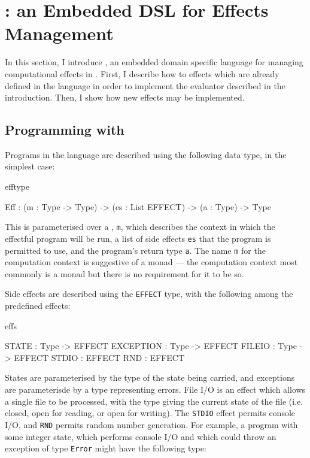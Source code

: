 \section{\Eff{}: an Embedded DSL for Effects Management} 

In this section, I introduce \Eff{}, an embedded domain specific language
for managing computational effects in \Idris{}. First, I describe how to
 effects which are already defined in the language in order to
implement the evaluator described in the introduction. Then, I show how new
effects may be implemented.

\label{sect:effdsl}

\subsection{Programming with \Eff{}}

Programs in the \Eff{} language are described using the following data type,
in the simplest case:

\begin{SaveVerbatim}{efftype}

Eff  : (m  : Type -> Type) -> 
       (es : List EFFECT) -> 
       (a  : Type) -> Type

\end{SaveVerbatim}

\noindent
This is parameterised over a , \texttt{m}, which
describes the context in which the effectful program will be run, a list
of side effects \texttt{es} that the program is permitted to use, 
and the program's return type \texttt{a}. The name \texttt{m} for the computation
context is suggestive of a monad --- the computation context most commonly 
is a monad but there is no requirement for it to be so.

Side effects are described using the \texttt{EFFECT} type, with the following
among the predefined effects:

\begin{SaveVerbatim}{effs}

STATE     : Type -> EFFECT
EXCEPTION : Type -> EFFECT
FILEIO    : Type -> EFFECT
STDIO     : EFFECT
RND       : EFFECT

\end{SaveVerbatim}

States are parameterised by the type of the state being carried, and exceptions
are parameterisde by a type representing errors. File I/O is an effect which
allows a single file to be processed, with the type giving the current state
of the file (i.e. closed, open for reading, or open for writing). The
\texttt{STDIO} effect permits console I/O, and \texttt{RND} permits random
number generation.
%
For example, a program with some integer state, which performs console I/O 
and which could throw
an exception of type \texttt{Error} might have the following type:

